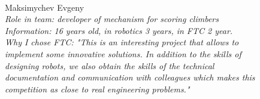 \begin{figure}[H]
	\begin{minipage}[h]{0.47\linewidth}
		\\		
	\end{minipage}
	\hfill
	\begin{minipage}[h]{0.47\linewidth}
		Maksimychev Evgeny\\
		\emph{Role in team: developer of mechanism for scoring climbers \\}
		\emph{Information: 16 years old, in robotics 3 years, in FTC 2 year. \\}
		\emph{Why I chose FTC: "This is an interesting project that allows to implement some innovative solutions. In addition to the skills of designing robots, we also obtain the skills of the technical documentation and communication with colleagues which makes this competition as close to real engineering problems."}	
	\end{minipage}
\end{figure}
\vfill 
